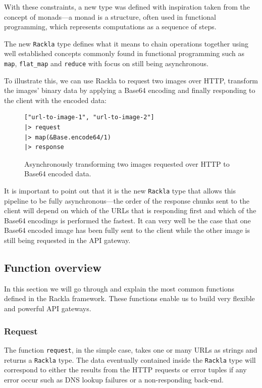\documentclass{cslthse-msc}
\begin{document}
With these constraints, a new type was defined with inspiration taken from the concept of monads---a monad is a structure, often used in functional programming, which represents computations as a sequence of steps.

The new \lstinline{Rackla} type defines what it means to chain operations together using well established concepts commonly found in functional programming such as \lstinline{map}, \lstinline{flat_map} and \lstinline{reduce} with focus on still being asynchronous.

To illustrate this, we can use Rackla to request two images over HTTP, transform the images' binary data by applying a Base64 encoding and finally responding to the client with the encoded data:

\begin{figure}[H]
  \centering
\begin{lstlisting}[breaklines=true,frame=single]
["url-to-image-1", "url-to-image-2"]
|> request
|> map(&Base.encode64/1)
|> response
\end{lstlisting}
  \caption{Asynchronously transforming two images requested over HTTP to Base64 encoded data.}
    \label{fig:map}
\end{figure}

It is important to point out that it is the new \lstinline{Rackla} type that allows this pipeline to be fully asynchronous---the order of the response chunks sent to the client will depend on which of the URLs that is responding first and which of the Base64 encodings is performed the fastest. It can very well be the case that one Base64 encoded image has been fully sent to the client while the other image is still being requested in the API gateway.

\subsection{Function overview}
In this section we will go through and explain the most common functions defined in the Rackla framework. These functions enable us to build very flexible and powerful API gateways.

\subsubsection{Request}
The function \lstinline{request}, in the simple case, takes one or many URLs as strings and returns a \lstinline{Rackla} type. The data eventually contained inside the \lstinline{Rackla} type will correspond to either the results from the HTTP requests or error tuples if any error occur such as DNS lookup failures or a non-responding back-end.
\end{document}
